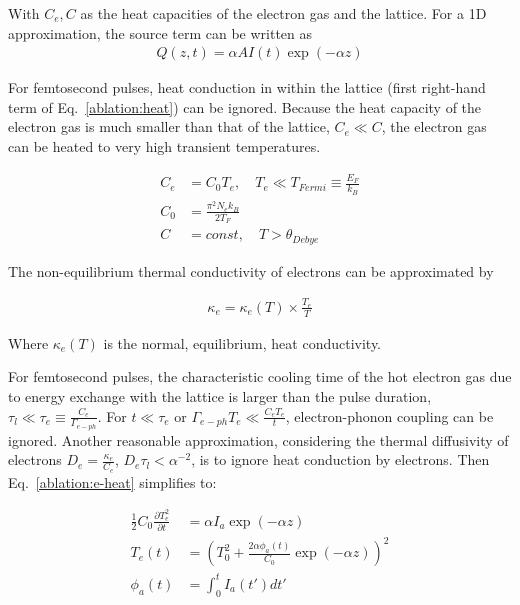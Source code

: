         With $C_e, C$ as the heat capacities of the electron gas and the lattice. For a 1D approximation, the source term can
        be written as
        \begin{align}
            Q(z,t) = \alpha A I(t) \exp(-\alpha z)
        \end{align}

        For femtosecond pulses, heat conduction in within the lattice (first right-hand term of Eq.~\ref{ablation:heat}) can be ignored.
        Because the heat capacity of the electron gas is much smaller than that of the lattice, $C_e \ll C$,  the electron gas can
        be heated to very high transient temperatures.

        \begin{align}
            C_e &= C_0 T_e, \quad T_e \ll T_{Fermi} \equiv \frac{E_F}{k_B} \\
            C_0 &= \frac{\pi^2 N_e k_B}{2T_F} \\
            C &= const, \quad T > \theta_{Debye}
        \end{align}

        The non-equilibrium thermal conductivity of electrons can be approximated by

        \begin{align}
            \kappa_e = \kappa_e(T) \times \frac{T_e}{T}
        \end{align}

        Where $\kappa_e(T)$ is the normal, equilibrium, heat conductivity.

            For femtosecond pulses, the characteristic cooling time of the hot electron gas due to energy exchange with the lattice
        is larger than the pulse duration, $\tau_l \ll \tau_e \equiv \frac{C_e}{\Gamma_{e-ph}}$. For
        $t \ll \tau_e$ or $\Gamma_{e-ph}T_e \ll \frac{C_e T_e}{t}$, electron-phonon coupling can be ignored. Another reasonable approximation,
        considering the thermal diffusivity of electrons $D_e = \frac{\kappa_e}{C_e}$, $D_e\tau_l < \alpha^{-2}$, is to ignore heat
        conduction by electrons. Then Eq.~\ref{ablation:e-heat} simplifies to:

        \begin{align}
            \frac{1}{2}C_0\frac{\partial T_e^2}{\partial t} &= \alpha I_a \exp(-\alpha z) \\
            T_e(t) &= \left(T_0^2 + \frac{2\alpha\phi_a(t)}{C_0}\exp(-\alpha z)\right)^2 \\
            \phi_a(t) &= \int_0^t I_a(t')dt'
        \end{align}

